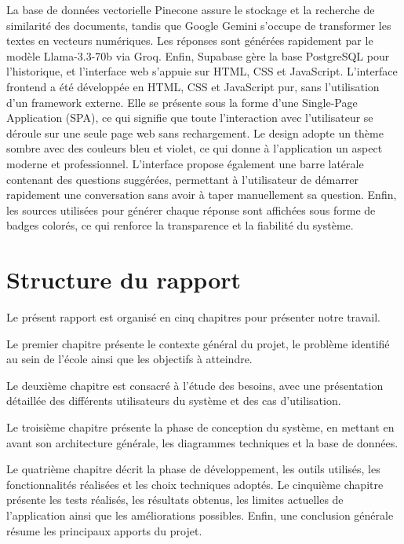 \documentclass[12pt, a4paper, twoside]{report}
\begin{document}
La base de données vectorielle Pinecone assure le stockage et la recherche de similarité des documents, tandis que Google Gemini s'occupe de transformer les textes en vecteurs numériques. Les réponses sont générées rapidement par le modèle Llama-3.3-70b via Groq. Enfin, Supabase gère la base PostgreSQL pour l'historique, et l'interface web s'appuie sur HTML, CSS et JavaScript.
L'interface frontend a été développée en HTML, CSS et JavaScript pur, sans l'utilisation d'un framework externe. Elle se présente sous la forme d'une Single-Page Application (SPA), ce qui signifie que toute l'interaction avec \newline l'utilisateur se déroule sur une seule page web sans rechargement. Le design adopte un thème sombre avec des couleurs bleu et violet, ce qui donne à l'application un aspect moderne et professionnel. L'interface propose également une barre latérale contenant des questions suggérées, permettant à l'utilisateur de démarrer rapidement une conversation sans avoir à taper manuellement sa question. Enfin, les sources utilisées pour générer chaque réponse sont affichées sous forme de badges colorés, ce qui renforce la transparence et la fiabilité du système.

\section{Structure du rapport}

Le présent rapport est organisé en cinq chapitres pour présenter notre travail.

Le premier chapitre présente le contexte général du projet, le problème identifié au sein de l’école ainsi que les objectifs à atteindre.
\newline

Le deuxième chapitre est consacré à l’étude des besoins, avec une présentation détaillée des différents utilisateurs du système et des cas d’utilisation.
\newline

Le troisième chapitre présente la phase de conception du système, en mettant en avant son architecture générale, les diagrammes techniques et la base de données.
\newline

Le quatrième chapitre décrit la phase de développement, les outils utilisés, les \newline fonctionnalités réalisées et les choix techniques adoptés.
Le cinquième chapitre présente les tests réalisés, les résultats obtenus, les limites actuelles de l’application ainsi que les \newline  améliorations possibles.
Enfin, une conclusion générale résume les principaux apports du projet.
\end{document}
